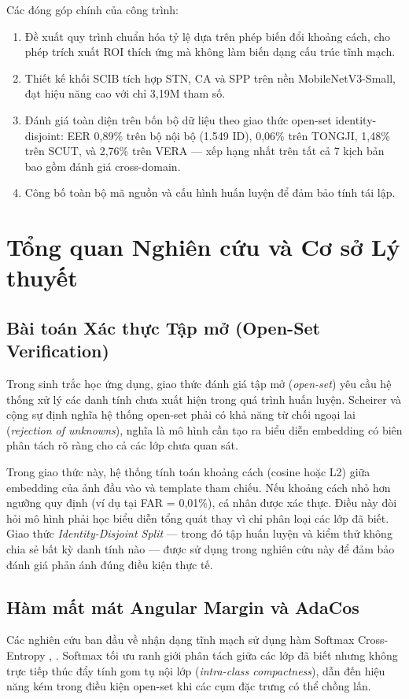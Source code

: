 \documentclass[12pt,a4paper]{article}
\begin{document}
Các đóng góp chính của công trình:
\begin{enumerate}
    \item Đề xuất quy trình chuẩn hóa tỷ lệ dựa trên phép biến đổi khoảng cách, cho phép trích xuất ROI thích ứng mà không làm biến dạng cấu trúc tĩnh mạch.
    \item Thiết kế khối SCIB tích hợp STN, CA và SPP trên nền MobileNetV3-Small, đạt hiệu năng cao với chỉ 3,19M tham số.
    \item Đánh giá toàn diện trên bốn bộ dữ liệu theo giao thức open-set identity-disjoint: EER 0,89\% trên bộ nội bộ (1.549 ID), 0,06\% trên TONGJI, 1,48\% trên SCUT, và 2,76\% trên VERA --- xếp hạng nhất trên tất cả 7 kịch bản bao gồm đánh giá cross-domain.
    \item Công bố toàn bộ mã nguồn và cấu hình huấn luyện để đảm bảo tính tái lập.
\end{enumerate}

\section{Tổng quan Nghiên cứu và Cơ sở Lý thuyết}

\subsection{Bài toán Xác thực Tập mở (Open-Set Verification)}
Trong sinh trắc học ứng dụng, giao thức đánh giá tập mở (\textit{open-set}) yêu cầu hệ thống xử lý các danh tính chưa xuất hiện trong quá trình huấn luyện. Scheirer và cộng sự \cite{b12} định nghĩa hệ thống open-set phải có khả năng từ chối ngoại lai (\textit{rejection of unknowns}), nghĩa là mô hình cần tạo ra biểu diễn embedding có biên phân tách rõ ràng cho cả các lớp chưa quan sát.

Trong giao thức này, hệ thống tính toán khoảng cách (cosine hoặc L2) giữa embedding của ảnh đầu vào và template tham chiếu. Nếu khoảng cách nhỏ hơn ngưỡng quy định (ví dụ tại FAR = 0,01\%), cá nhân được xác thực. Điều này đòi hỏi mô hình phải học biểu diễn tổng quát thay vì chỉ phân loại các lớp đã biết. Giao thức \textit{Identity-Disjoint Split} \cite{b13} --- trong đó tập huấn luyện và kiểm thử không chia sẻ bất kỳ danh tính nào --- được sử dụng trong nghiên cứu này để đảm bảo đánh giá phản ánh đúng điều kiện thực tế.

\subsection{Hàm mất mát Angular Margin và AdaCos}
Các nghiên cứu ban đầu về nhận dạng tĩnh mạch sử dụng hàm Softmax Cross-Entropy \cite{b1}, \cite{b_closedset}. Softmax tối ưu ranh giới phân tách giữa các lớp đã biết nhưng không trực tiếp thúc đẩy tính gom tụ nội lớp (\textit{intra-class compactness}), dẫn đến hiệu năng kém trong điều kiện open-set khi các cụm đặc trưng có thể chồng lấn.
\end{document}
